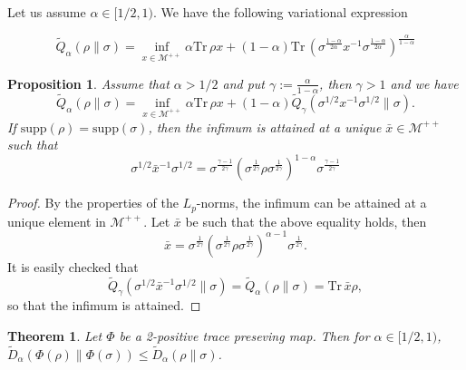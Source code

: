 \documentclass[12pt]{article}
\newtheorem{theorem}{Theorem}
\newtheorem{prop}{Proposition}
\theoremstyle{definition}
\theoremstyle{remark}
\def\supp{\mathrm{supp}}
\def\Tr{\mathrm{Tr}\,}
\def\Me{\mathcal M}
\begin{document}
Let us assume $\alpha\in [1/2,1)$. We have the following variational expression \cite{frank2013monotonicity,hiai2021quantum}

\begin{equation}
\label{eq:sandw_var}\tilde Q_\alpha(\rho\|\sigma)=\inf_{x\in \Me^{++}} \alpha \Tr \rho x +(1-\alpha)\Tr
\left(\sigma^{\frac{1-\alpha}{2\alpha}}x^{-1}\sigma^{\frac{1-\alpha}{2\alpha}}\right)^{\frac{\alpha}{1-\alpha}}
\end{equation}

\begin{prop}\label{prop:var_alph}
Assume that $\alpha>1/2$ and put $\gamma:=\frac{\alpha}{1-\alpha}$, then $\gamma>1$ and we have
\[
\tilde Q_\alpha(\rho\|\sigma)=\inf_{x\in \Me^{++}} \alpha \Tr \rho x +(1-\alpha)\tilde
Q_\gamma(\sigma^{1/2}x^{-1}\sigma^{1/2}\|\sigma).
\]
If $\supp(\rho)=\supp(\sigma)$, then the infimum is attained at a unique $\bar x\in \Me^{++}$
such that 
\[
\sigma^{1/2}\bar x^{-1}\sigma^{1/2}=\sigma^{\frac{\gamma-1}{2\gamma}}\left(\sigma^{\frac{1}{2\gamma}}\rho\sigma^{\frac{1}{2\gamma}}\right)^{1-\alpha}\sigma^{\frac{\gamma-1}{2\gamma}}
\]
\end{prop}

\begin{proof} 
By the properties of the $L_p$-norms, the infimum can be attained at a unique element in
$\Me^{++}$. Let $\bar x$ be such that the above equality holds, then  
\[
\bar
x=\sigma^{\frac{1}{2\gamma}}(\sigma^{\frac{1}{2\gamma}}\rho\sigma^{\frac{1}{2\gamma}})^{\alpha-1}\sigma^{\frac{1}{2\gamma}}.
\]
It is easily checked that
\[
\tilde Q_\gamma(\sigma^{1/2}\bar x^{-1}\sigma^{1/2}\|\sigma)=\tilde
Q_\alpha(\rho\|\sigma)=\Tr \bar x\rho,
\]
so that the infimum is attained.

\end{proof}


\begin{theorem}\label{thm:dpi}
Let $\Phi$ be a 2-positive trace preseving map. Then for $\alpha\in [1/2,1)$,
$\tilde D_\alpha(\Phi(\rho)\|\Phi(\sigma))\le \tilde D_\alpha(\rho\|\sigma)$.
\end{theorem}
\end{document}
